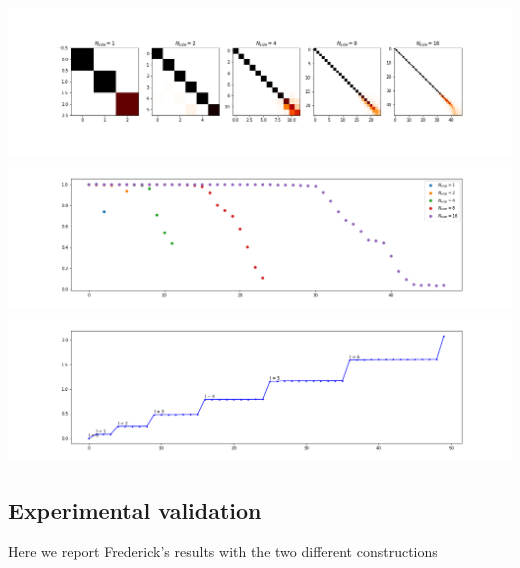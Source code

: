 \begin{minipage}{.5\textwidth}
	\centering
	\includegraphics[width=0.9\linewidth]{../codes/02.HeatKernelGraphLaplacian/HEALPix/06_figures/optimal_thresholded.png}
	\includegraphics[width=0.9\linewidth]{../codes/02.HeatKernelGraphLaplacian/HEALPix/06_figures/optimal_thresholded_diagonal.png}
	\includegraphics[width=0.9\linewidth]{../codes/02.HeatKernelGraphLaplacian/HEALPix/06_figures/optimal_thresholded_eigenvalues.png}
	\label{fig:New spectrum}
\end{minipage}


\clearpage
\subsection{Experimental validation}
\label{sec:Experimental validation}
Here we report Frederick's results with the two different constructions
